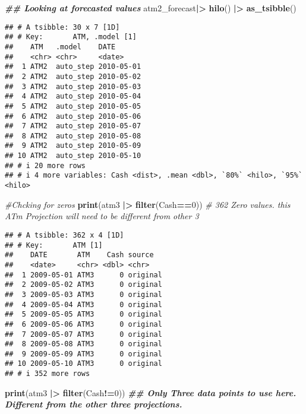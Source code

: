 \documentclass[
]{article}
\newenvironment{Shaded}{\begin{snugshade}}{\end{snugshade}}
\newcommand{\CommentTok}[1]{\textcolor[rgb]{0.56,0.35,0.01}{\textit{#1}}}
\newcommand{\DecValTok}[1]{\textcolor[rgb]{0.00,0.00,0.81}{#1}}
\newcommand{\DocumentationTok}[1]{\textcolor[rgb]{0.56,0.35,0.01}{\textbf{\textit{#1}}}}
\newcommand{\FunctionTok}[1]{\textcolor[rgb]{0.13,0.29,0.53}{\textbf{#1}}}
\newcommand{\NormalTok}[1]{#1}
\newcommand{\SpecialCharTok}[1]{\textcolor[rgb]{0.81,0.36,0.00}{\textbf{#1}}}
\begin{document}
\begin{Shaded}
\begin{Highlighting}[]
\DocumentationTok{\#\# Looking at forecasted values }
\NormalTok{atm2\_forecast}\SpecialCharTok{|\textgreater{}} \FunctionTok{hilo}\NormalTok{() }\SpecialCharTok{|\textgreater{}} \FunctionTok{as\_tsibble}\NormalTok{()}
\end{Highlighting}
\end{Shaded}

\begin{verbatim}
## # A tsibble: 30 x 7 [1D]
## # Key:       ATM, .model [1]
##    ATM   .model    DATE      
##    <chr> <chr>     <date>    
##  1 ATM2  auto_step 2010-05-01
##  2 ATM2  auto_step 2010-05-02
##  3 ATM2  auto_step 2010-05-03
##  4 ATM2  auto_step 2010-05-04
##  5 ATM2  auto_step 2010-05-05
##  6 ATM2  auto_step 2010-05-06
##  7 ATM2  auto_step 2010-05-07
##  8 ATM2  auto_step 2010-05-08
##  9 ATM2  auto_step 2010-05-09
## 10 ATM2  auto_step 2010-05-10
## # i 20 more rows
## # i 4 more variables: Cash <dist>, .mean <dbl>, `80%` <hilo>, `95%` <hilo>
\end{verbatim}

\begin{Shaded}
\begin{Highlighting}[]
\CommentTok{\#Chcking for zeros}
\FunctionTok{print}\NormalTok{(atm3 }\SpecialCharTok{|\textgreater{}} \FunctionTok{filter}\NormalTok{(Cash}\SpecialCharTok{==}\DecValTok{0}\NormalTok{)) }\CommentTok{\# 362 Zero values. this ATm Projection will need to be different from other 3}
\end{Highlighting}
\end{Shaded}

\begin{verbatim}
## # A tsibble: 362 x 4 [1D]
## # Key:       ATM [1]
##    DATE       ATM    Cash source  
##    <date>     <chr> <dbl> <chr>   
##  1 2009-05-01 ATM3      0 original
##  2 2009-05-02 ATM3      0 original
##  3 2009-05-03 ATM3      0 original
##  4 2009-05-04 ATM3      0 original
##  5 2009-05-05 ATM3      0 original
##  6 2009-05-06 ATM3      0 original
##  7 2009-05-07 ATM3      0 original
##  8 2009-05-08 ATM3      0 original
##  9 2009-05-09 ATM3      0 original
## 10 2009-05-10 ATM3      0 original
## # i 352 more rows
\end{verbatim}

\begin{Shaded}
\begin{Highlighting}[]
\FunctionTok{print}\NormalTok{(atm3 }\SpecialCharTok{|\textgreater{}} \FunctionTok{filter}\NormalTok{(Cash}\SpecialCharTok{!=}\DecValTok{0}\NormalTok{)) }\DocumentationTok{\#\# Only Three data points to use here. Different from the other three projections.}
\end{Highlighting}
\end{Shaded}
\end{document}
